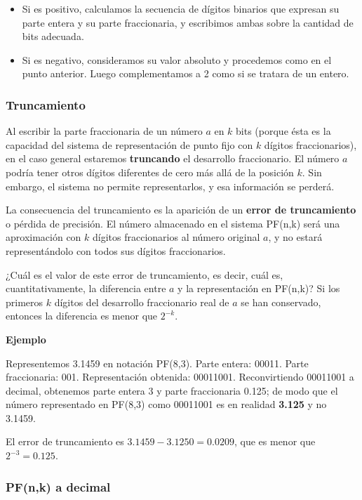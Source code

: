 \documentclass[spanish,a4paper,]{article}
\providecommand{\tightlist}{%
  \setlength{\itemsep}{0pt}\setlength{\parskip}{0pt}}
\begin{document}
\begin{itemize}
\tightlist
\item
  Si es positivo, calculamos la secuencia de dígitos binarios que
  expresan su parte entera y su parte fraccionaria, y escribimos ambas
  sobre la cantidad de bits adecuada.
\item
  Si es negativo, consideramos su valor absoluto y procedemos como en el
  punto anterior. Luego complementamos a 2 como si se tratara de un
  entero.
\end{itemize}

\hypertarget{truncamiento}{%
\subsubsection{Truncamiento}\label{truncamiento}}

Al escribir la parte fraccionaria de un número \(a\) en \(k\) bits
(porque ésta es la capacidad del sistema de representación de punto fijo
con \(k\) dígitos fraccionarios), en el caso general estaremos
\textbf{truncando} el desarrollo fraccionario. El número \(a\) podría
tener otros dígitos diferentes de cero más allá de la posición \(k\).
Sin embargo, el sistema no permite representarlos, y esa información se
perderá.

La consecuencia del truncamiento es la aparición de un \textbf{error de
truncamiento} o pérdida de precisión. El número almacenado en el sistema
PF(n,k) será una aproximación con \(k\) dígitos fraccionarios al número
original \(a\), y no estará representándolo con todos sus dígitos
fraccionarios.

¿Cuál es el valor de este error de truncamiento, es decir, cuál es,
cuantitativamente, la diferencia entre \(a\) y la representación en
PF(n,k)? Si los primeros \(k\) dígitos del desarrollo fraccionario real
de \(a\) se han conservado, entonces la diferencia es menor que
\(2^{-k}\).

\textbf{Ejemplo}

Representemos 3.1459 en notación PF(8,3). Parte entera: 00011. Parte
fraccionaria: 001. Representación obtenida: 00011001. Reconvirtiendo
00011001 a decimal, obtenemos parte entera 3 y parte fraccionaria 0.125;
de modo que el número representado en PF(8,3) como 00011001 es en
realidad \textbf{3.125} y no 3.1459.

El error de truncamiento es \(3.1459 - 3.1250 = 0.0209\), que es menor
que \(2^{-3} = 0.125\).

\hypertarget{pfnk-a-decimal}{%
\subsubsection{PF(n,k) a decimal}\label{pfnk-a-decimal}}
\end{document}

